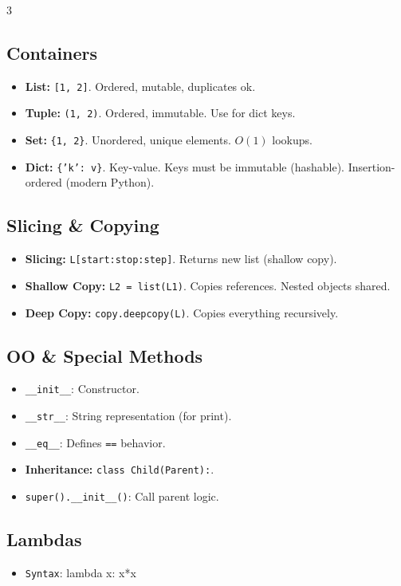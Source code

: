 \documentclass[10pt, landscape, a4paper]{article}
\begin{document}
\begin{multicols*}{3}
  \subsection{Containers}
  \begin{itemize}
    \item \textbf{List:} \texttt{[1, 2]}. Ordered, mutable, duplicates ok.
    \item \textbf{Tuple:} \texttt{(1, 2)}. Ordered, immutable. Use
      for dict keys.
    \item \textbf{Set:} \texttt{\{1, 2\}}. Unordered, unique
      elements. $O(1)$ lookups.
    \item \textbf{Dict:} \texttt{\{'k': v\}}. Key-value. Keys must be
      immutable (hashable). Insertion-ordered (modern Python).
  \end{itemize}

  \subsection{Slicing \& Copying}
  \begin{itemize}
    \item \textbf{Slicing:} \texttt{L[start:stop:step]}. Returns new
      list (shallow copy).
    \item \textbf{Shallow Copy:} \texttt{L2 = list(L1)}. Copies
      references. Nested objects shared.
    \item \textbf{Deep Copy:} \texttt{copy.deepcopy(L)}. Copies
      everything recursively.
  \end{itemize}

  \subsection{OO \& Special Methods}
  \begin{itemize}
    \item \texttt{\_\_init\_\_}: Constructor.
    \item \texttt{\_\_str\_\_}: String representation (for print).
    \item \texttt{\_\_eq\_\_}: Defines \texttt{==} behavior.
    \item \textbf{Inheritance:} \texttt{class Child(Parent):}.
    \item \texttt{super().\_\_init\_\_()}: Call parent logic.
  \end{itemize}

  \subsection{Lambdas}
  \begin{itemize}
    \item \texttt{Syntax}: lambda x: x*x
  \end{itemize}

\end{multicols*}
\end{document}
